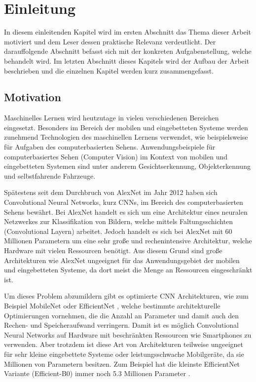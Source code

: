 \chapter{Einleitung}
In diesem einleitenden Kapitel wird im ersten Abschnitt das Thema dieser Arbeit motiviert und dem Leser dessen praktische Relevanz verdeutlicht. Der darauffolgende Abschnitt befasst sich mit der konkreten Aufgabenstellung, welche behandelt wird. Im letzten Abschnitt dieses Kapitels wird der Aufbau der Arbeit beschrieben und die einzelnen Kapitel werden kurz zusammengefasst.

\section{Motivation}
Maschinelles Lernen wird heutzutage in vielen verschiedenen Bereichen eingesetzt. Besonders im Bereich der mobilen und eingebetteten Systeme werden zunehmend Technologien des maschinellen Lernens verwendet, wie beispielsweise für Aufgaben des computerbasierten Sehens.
Anwendungsbeispiele für computerbasiertes Sehen (Computer Vision) im Kontext von mobilen und eingebetteten Systemen sind unter anderem Gesichtserkennung, Objekterkennung und selbstfahrende Fahrzeuge.

Spätestens seit dem Durchbruch von AlexNet im Jahr 2012 \cite{krizhevsky_imagenet_2017} haben sich Convolutional Neural Networks, kurz CNNs, im Bereich des computerbasierten Sehens bewährt. Bei AlexNet handelt es sich um eine Architektur eines neuralen Netzwerkes zur Klassifikation von Bildern, welche mittels Faltungsschichten (Convolutional Layern) arbeitet. Jedoch handelt es sich bei AlexNet mit 60 Millionen Parametern um eine sehr große und rechenintensive Architektur, welche Hardware mit vielen Ressourcen benötigt. Aus diesem Grund sind große Architekturen wie AlexNet ungeeignet für das Anwendungsgebiet der mobilen und eingebetteten Systeme, da dort meist die Menge an Ressourcen eingeschränkt ist.

Um dieses Problem abzumildern gibt es optimierte CNN Architekturen, wie zum Beispiel MobileNet oder EfficientNet \cite{howard_mobilenets_2017, sandler_mobilenetv2_2019, howard_searching_2019, tan_efficientnet_2020}, welche bestimmte architekturelle Optimierungen vornehmen, die die Anzahl an Parameter und damit auch den Rechen- und Speicheraufwand verringern. Damit ist es möglich Convolutional Neural Networks auf Hardware mit beschränkten Ressourcen wie Smartphones zu verwenden. Aber trotzdem ist diese Art von Architekturen teilweise ungeeignet für sehr kleine eingebettete Systeme oder leistungsschwache Mobilgeräte, da sie Millionen von Parametern besitzen. Zum Beispiel hat die kleinste EfficientNet Variante (Efficient-B0) immer noch 5.3 Millionen Parameter \cite{tan_efficientnet_2020}.

